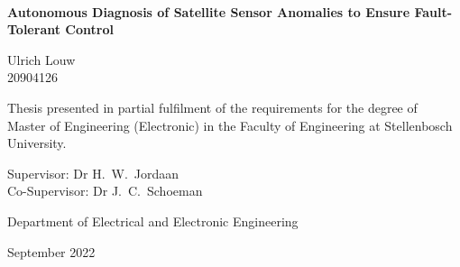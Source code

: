 \graphicspath{{frontmatter/fig/}}

\begin{titlepage}
	\begin{center}
		
		
		
		~\vspace{4.5em}
		
		{\sffamily \bfseries \huge Autonomous Diagnosis of Satellite Sensor Anomalies to Ensure Fault-Tolerant Control \par}
		
		\vspace{7em}
		
		{\large {\Large  Ulrich Louw} \\ 20904126 \par}
		
		\vspace{8em}
		
		{\large Thesis presented in partial fulfilment of the requirements for the degree of \\ Master of Engineering (Electronic) in the Faculty of Engineering at Stellenbosch University. \par}
		
		\vfill
		
		{\large {Supervisor}: Dr H.\ W.\ Jordaan} \\

		{\large {Co-Supervisor}: Dr J.\ C.\ Schoeman}\\
		{Department of Electrical and Electronic Engineering \par}		
		\vspace{10em}
		
		{\Large September 2022}
	\end{center}
\end{titlepage}
